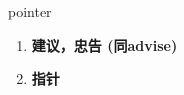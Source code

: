 
\begin{frame}
{\huge pointer}
\begin{center}
\begin{enumerate}\Large
  \item \textbf{建议，忠告 (同advise)}
  \item \textbf{指针}
\end{enumerate}
\end{center}
\end{frame}
